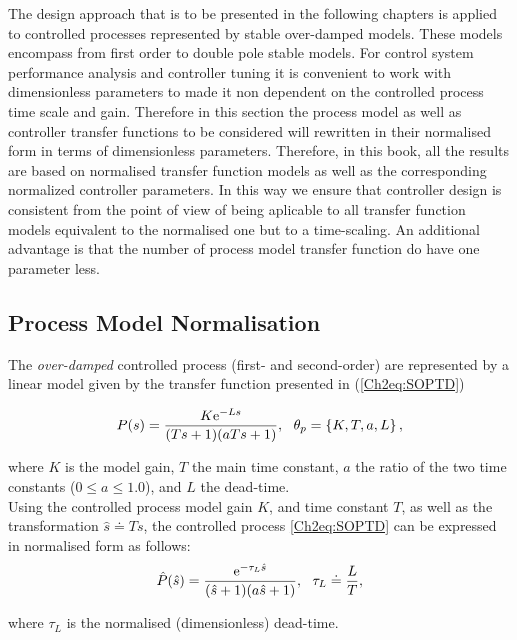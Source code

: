 The design approach that is to be presented in the following chapters is applied to controlled processes represented by stable over-damped models. These models encompass from first order to double pole stable models. For control system performance analysis and controller tuning it is convenient to work with dimensionless parameters to made it non dependent on the controlled process time scale and gain. Therefore in this section the process model as well as controller transfer functions to be considered will rewritten in their normalised form in terms of dimensionless parameters.  Therefore, in this book, all the results are based on normalised transfer function models as well as the corresponding normalized controller parameters. In this way we ensure that controller design is consistent from the point of view of being aplicable to all transfer function models equivalent to the normalised one but to a time-scaling.  An additional advantage is that the number of process model transfer function do have one parameter less.\\

\subsection{Process Model Normalisation}
\label{sec:4.1}

The \emph{over-damped} controlled process (first- and second-order) are represented by a linear model given by the transfer function presented in (\ref{Ch2eq:SOPTD})

\begin{equation}
	P(s) = \frac{K \mathrm{e}^{-L s}}{(T s+1)(a T s+1)}, \ \ \theta_p=\left\{K, T, a, L \right\}, 
\end{equation}

\noindent where $K$ is the model gain, $T$ the main time constant, $a$ the ratio of the two time constants ($0 \leq a \leq 1.0$), and $L$ the dead-time.\\

Using the controlled process model gain $K$, and time constant $T$, as well as the transformation $\hat s \doteq T s$, the controlled process \eqref{Ch2eq:SOPTD} can be expressed in normalised form as follows:
\begin{equation}
	\hat P(\hat s) = \frac{\mathrm{e}^{-\tau_L \hat s}}{(\hat s +1)(a \hat s +1)}, \ \ \tau_L \doteq \frac{L}{T}, 
	\label{Ch2eq:SOPTD_n}
\end{equation}

\noindent where $\tau_L$ is the normalised (dimensionless) dead-time.\\

